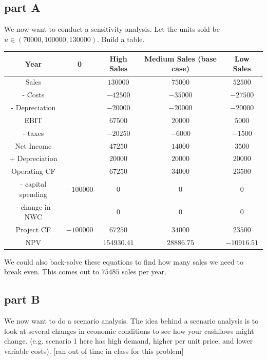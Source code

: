 \documentclass[12pt, letterpaper, parskip = full]{article}
\begin{document}
    \subsection{part A}

    We now want to conduct a sensitivity analysis. Let the units sold be \(u \in (70000,100000,130000)\). Build a table.

    \begin{center}
	\begin{tabular}{|c|c|c|c|c|}
		\hline
		Year & 0 & High Sales & Medium Sales (base case) & Low Sales \\
		\hline
		Sales & & \(130000\) & \(75000\) & \(52500\) \\
        \hline
        - Costs & & \(-42500\) & \(-35000\) & \(-27500\)\\
        \hline
        - Depreciation & & \(-20000\) &  \(-20000\) & \(-20000\) \\
        \hline
        \hline
        EBIT & & \(67500\) & \(20000\) & \(5000\) \\
        \hline
        - taxes & & \(-20250\) & \(-6000\) & \(-1500\) \\
        \hline
        \hline
        Net Income & & \(47250\) & \(14000\) & \(3500\) \\
        \hline
        + Depreciation & & \(20000\) & \(20000\) & \(20000\) \\
        \hline
        \hline
        Operating CF & & \(67250\) & \(34000\) & \(23500\) \\
        \hline
        - capital spending & \(-100000\) & \(0\) & \(0\) & \(0\) \\
        \hline
        - change in NWC & & \(0\) & \(0\) & \(0\) \\
        \hline
        \hline
        Project CF & \(-100000\) & \(67250\) & \(34000\) & \(23500\) \\
        \hline
        \hline
        NPV & & \(154930.41\) & \(28886.75\) & \(-10916.51\) \\
        \hline 
	\end{tabular}
	\end{center}

    We could also back-solve these equations to find how many sales we need to break even. This comes out to \(75485\) sales per year.

    \subsection{part B}

    We now want to do a scenario analysis. The idea behind a scenario analysis is to look at several changes in economic conditions to see how your cashflows might change. (e.g. scenario 1 here has high demand, higher per unit price, and lower variable costs). [ran out of time in class for this problem]
\end{document}
